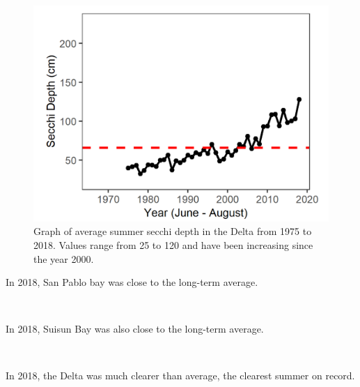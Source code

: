 \documentclass[
]{book}
\begin{document}
\begin{panel-grid}
\begin{columns-nocenter}
\begin{column800}
\begin{expand}
\begin{figure}
\includegraphics[width=15.25in]{figures/secchi_dtsummer} \caption{Graph of average summer secchi depth in the Delta from 1975 to 2018. Values range from 25 to 120 and have been increasing since the year 2000.}\label{fig:unnamed-chunk-53}
\end{figure}

\end{expand}

\end{column800}

\end{columns-nocenter}

\begin{columns-nocenter}

\begin{column800}

In 2018, San Pablo bay was close to the long-term average.

\end{column800}

\begin{column40}

~

\end{column40}

\begin{column800}

In 2018, Suisun Bay was also close to the long-term average.

\end{column800}

\begin{column40}

~

\end{column40}

\begin{column800}

In 2018, the Delta was much clearer than average, the clearest summer on record.

\end{column800}

\end{columns-nocenter}

\end{panel-grid}
\end{document}
